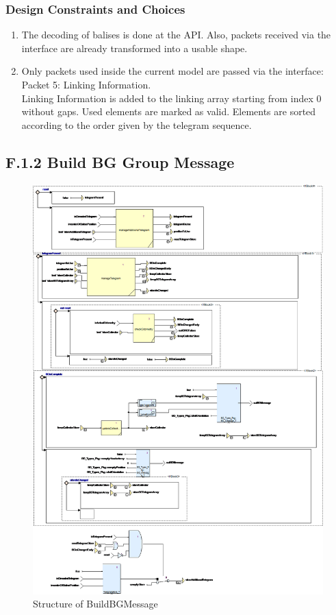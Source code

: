 \documentclass{template/openetcs_report}
\begin{document}
\subsubsection{Design Constraints and Choices}

\begin{enumerate}
\item The decoding of balises is done at the API. Also, packets received via the interface are already transformed into a usable shape.
\item Only packets used inside the current model are passed via the interface:\\
Packet 5: Linking Information.\\
Linking Information is added to the linking array starting from index 0 without gaps. Used elements are marked as valid. Elements are sorted according to the order given by the telegram sequence.
\end{enumerate}



\subsection{F.1.2 Build BG Group Message}

\begin{figure}[hbtp]
\centering
\includegraphics[width=\textwidth]{../images/BuildBGMessage_diagram.png}
\caption{Structure of BuildBGMessage}
\end{figure}
\end{document}
